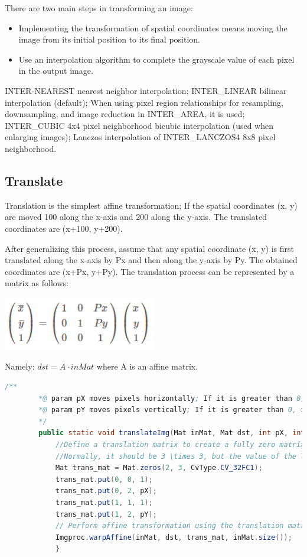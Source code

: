 \documentclass{article}
\begin{document}
	There are two main steps in transforming an image:
	\begin{itemize}
		\item Implementing the transformation of spatial coordinates means moving the image from its initial position to its final position.
		\item Use an interpolation algorithm to complete the grayscale value of each pixel in the output image.
	\end{itemize}
	INTER-NEAREST nearest neighbor interpolation;
	INTER\_LINEAR bilinear interpolation (default);
	When using pixel region relationships for resampling, downsampling, and image reduction in INTER\_AREA, it is used;
	INTER\_CUBIC 4x4 pixel neighborhood bicubic interpolation (used when enlarging images);
	Lanczos interpolation of INTER\_LANCZOS4 8x8 pixel neighborhood.
	
	\subsection{Translate}
	Translation is the simplest affine transformation; If the spatial coordinates (x, y) are moved 100 along the x-axis and 200 along the y-axis. The translated coordinates are (x+100, y+200).
	
	After generalizing this process, assume that any spatial coordinate (x, y) is first translated along the x-axis by Px and then along the y-axis by Py. The obtained coordinates are (x+Px, y+Py). The translation process can be represented by a matrix as follows:
	
	\begin{center}
		\includegraphics[width=0.5\textwidth]{mdpic/20240918163045.png}
	\end{center}
	
	Namely: \( dst=A \cdot inMat \) where A is an affine matrix.
	\begin{lstlisting}[language=Java]
		/**
		*@ param pX moves pixels horizontally; If it is greater than 0, it indicates positive movement along the axis; if it is less than 0, it indicates negative movement along the axis
		*@ param pY moves pixels vertically; If it is greater than 0, it indicates positive movement along the axis; if it is less than 0, it indicates negative movement along the axis
		*/
		public static void translateImg(Mat inMat, Mat dst, int pX, int pY) {
			//Define a translation matrix to create a fully zero matrix with 2 rows and 3 columns;
			//Normally, it should be 3 \times 3, but the value of the last line has been fixed to 0 0 1
			Mat trans_mat = Mat.zeros(2, 3, CvType.CV_32FC1);
			trans_mat.put(0, 0, 1);
			trans_mat.put(0, 2, pX);
			trans_mat.put(1, 1, 1);
			trans_mat.put(1, 2, pY);
			// Perform affine transformation using the translation matrix
			Imgproc.warpAffine(inMat, dst, trans_mat, inMat.size());
			}
		\end{lstlisting}
	
\end{document}
